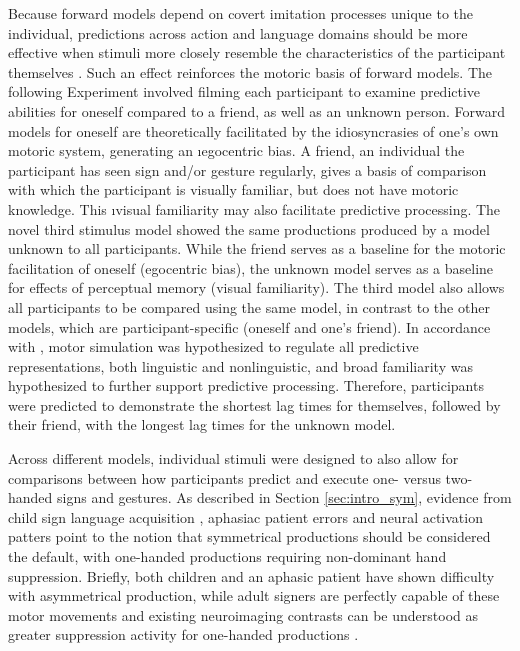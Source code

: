             Because forward models depend on covert imitation processes unique to the individual, predictions across action and language domains should be more effective when stimuli more closely resemble the characteristics of the participant themselves \cite{knoblich2001, nye2003, watkins2017}. Such an effect reinforces the motoric basis of forward models. The following Experiment involved filming each participant to examine predictive abilities for oneself compared to a friend, as well as an unknown person. Forward models for oneself are theoretically facilitated by the idiosyncrasies of one’s own motoric system, generating an \i{egocentric bias}. A friend, an individual the participant has seen sign and/or gesture regularly, gives a basis of comparison with which the participant is visually familiar, but does not have motoric knowledge. This \i{visual familiarity} may also facilitate predictive processing. The novel third stimulus model showed the same productions produced by a model unknown to all participants. While the friend serves as a baseline for the motoric facilitation of oneself (egocentric bias), the unknown model serves as a baseline for effects of perceptual memory (visual familiarity). The third model also allows all participants to be compared using the same model, in contrast to the other models, which are participant-specific (oneself and one’s friend).  In accordance with , motor simulation was hypothesized to regulate all predictive representations, both linguistic and nonlinguistic, and broad familiarity was hypothesized to further support predictive processing. Therefore, participants were predicted to demonstrate the shortest lag times for themselves, followed by their friend, with the longest lag times for the unknown model.\par 
            Across different models, individual stimuli were designed to also allow for comparisons between how participants predict and execute one- versus two-handed signs and gestures. As described in Section \ref{sec:intro_sym}, evidence from child sign language acquisition \cite{meier2006}, aphasiac patient errors \cite{hickok1996} and neural activation patters \cite{emm2016, aramaki2006, vine2008b} point to the notion that symmetrical productions should be considered the default, with one-handed productions requiring non-dominant hand suppression. Briefly, both children and an aphasic patient have shown difficulty with asymmetrical production, while adult signers are perfectly capable of these motor movements \cite{meier2006,hickok1996} and existing neuroimaging contrasts can be understood as greater suppression activity for one-handed productions \cite{emm2016}. \par
